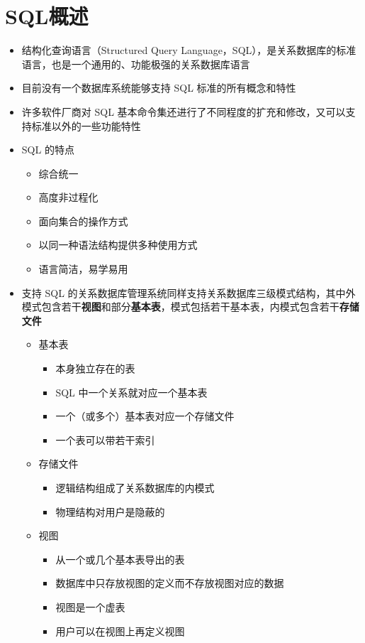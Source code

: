 \section{SQL概述}
\begin{itemize}
    \item 结构化查询语言（Structured Query Language，SQL），是关系数据库的标准语言，也是一个通用的、功能极强的关系数据库语言
    \item 目前没有一个数据库系统能够支持 SQL 标准的所有概念和特性
    \item 许多软件厂商对 SQL 基本命令集还进行了不同程度的扩充和修改，又可以支持标准以外的一些功能特性
    \item SQL 的特点
    \begin{itemize}
        \item 综合统一
        \item 高度非过程化
        \item 面向集合的操作方式
        \item 以同一种语法结构提供多种使用方式
        \item 语言简洁，易学易用
    \end{itemize}
    \item 支持 SQL 的关系数据库管理系统同样支持关系数据库三级模式结构，其中外模式包含若干\textbf{视图}和部分\textbf{基本表}，模式包括若干基本表，内模式包含若干\textbf{存储文件}
    \begin{itemize}
        \item 基本表
        \begin{itemize}
            \item 本身独立存在的表
            \item SQL 中一个关系就对应一个基本表
            \item 一个（或多个）基本表对应一个存储文件
            \item 一个表可以带若干索引
        \end{itemize}
        \item 存储文件
        \begin{itemize}
            \item 逻辑结构组成了关系数据库的内模式
            \item 物理结构对用户是隐蔽的
        \end{itemize}
        \item 视图
        \begin{itemize}
            \item 从一个或几个基本表导出的表
            \item 数据库中只存放视图的定义而不存放视图对应的数据
            \item 视图是一个虚表
            \item 用户可以在视图上再定义视图
        \end{itemize}
    \end{itemize}
\end{itemize}

